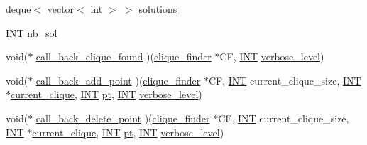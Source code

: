 \begin{DoxyCompactItemize}
deque$<$ vector$<$ int $>$ $>$ \mbox{\hyperlink{classclique__finder_a2916cabdb7cbeb5418e7243b9984f963}{solutions}}
\item 
\mbox{\hyperlink{galois_8h_a09fddde158a3a20bd2dcadb609de11dc}{I\+NT}} \mbox{\hyperlink{classclique__finder_a2bb252eadf0bf23d667e95dd88079c64}{nb\+\_\+sol}}
\item 
void($\ast$ \mbox{\hyperlink{classclique__finder_aa7aa4e0c69d9c12cd294b89bc0167473}{call\+\_\+back\+\_\+clique\+\_\+found}} )(\mbox{\hyperlink{classclique__finder}{clique\+\_\+finder}} $\ast$CF, \mbox{\hyperlink{galois_8h_a09fddde158a3a20bd2dcadb609de11dc}{I\+NT}} \mbox{\hyperlink{classclique__finder_a0039c6c78005df91c2f78efdc1c8156f}{verbose\+\_\+level}})
\item 
void($\ast$ \mbox{\hyperlink{classclique__finder_ad9a6cc663ef506e169e35b86919d682b}{call\+\_\+back\+\_\+add\+\_\+point}} )(\mbox{\hyperlink{classclique__finder}{clique\+\_\+finder}} $\ast$CF, \mbox{\hyperlink{galois_8h_a09fddde158a3a20bd2dcadb609de11dc}{I\+NT}} current\+\_\+clique\+\_\+size, \mbox{\hyperlink{galois_8h_a09fddde158a3a20bd2dcadb609de11dc}{I\+NT}} $\ast$\mbox{\hyperlink{classclique__finder_a220d65214d4e619b47eef475cc6499ad}{current\+\_\+clique}}, \mbox{\hyperlink{galois_8h_a09fddde158a3a20bd2dcadb609de11dc}{I\+NT}} \mbox{\hyperlink{clique__finder_8_c_aec1f1a2b30fdca8844c2932384483145}{pt}}, \mbox{\hyperlink{galois_8h_a09fddde158a3a20bd2dcadb609de11dc}{I\+NT}} \mbox{\hyperlink{classclique__finder_a0039c6c78005df91c2f78efdc1c8156f}{verbose\+\_\+level}})
\item 
void($\ast$ \mbox{\hyperlink{classclique__finder_a203506ef59de6dc936449480eb1dacf6}{call\+\_\+back\+\_\+delete\+\_\+point}} )(\mbox{\hyperlink{classclique__finder}{clique\+\_\+finder}} $\ast$CF, \mbox{\hyperlink{galois_8h_a09fddde158a3a20bd2dcadb609de11dc}{I\+NT}} current\+\_\+clique\+\_\+size, \mbox{\hyperlink{galois_8h_a09fddde158a3a20bd2dcadb609de11dc}{I\+NT}} $\ast$\mbox{\hyperlink{classclique__finder_a220d65214d4e619b47eef475cc6499ad}{current\+\_\+clique}}, \mbox{\hyperlink{galois_8h_a09fddde158a3a20bd2dcadb609de11dc}{I\+NT}} \mbox{\hyperlink{clique__finder_8_c_aec1f1a2b30fdca8844c2932384483145}{pt}}, \mbox{\hyperlink{galois_8h_a09fddde158a3a20bd2dcadb609de11dc}{I\+NT}} \mbox{\hyperlink{classclique__finder_a0039c6c78005df91c2f78efdc1c8156f}{verbose\+\_\+level}})
\item 

\end{DoxyCompactItemize}

